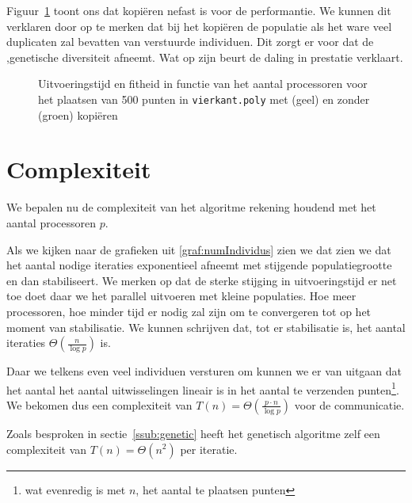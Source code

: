 Figuur~\ref{graf:nocopycopy} toont ons dat kopiëren nefast is voor de performantie.
We kunnen dit verklaren door op te merken dat bij het kopiëren de populatie als het ware veel duplicaten zal bevatten van verstuurde individuen. Dit zorgt er voor dat de ,genetische diversiteit afneemt. Wat op zijn beurt de daling in prestatie verklaart.

\begin{figure}[H]

\caption{Uitvoeringstijd en fitheid in functie van het aantal processoren voor het plaatsen van 500 punten in \texttt{vierkant.poly} met (geel) en zonder (groen) kopiëren}
\label{graf:nocopycopy}
\end{figure}

\section{Complexiteit}
\label{sub:parrcomplex}
We bepalen nu de complexiteit van het algoritme rekening houdend met het aantal processoren $p$.


Als we kijken naar de grafieken uit \ref{graf:numIndividus} zien we dat zien we dat het aantal nodige iteraties exponentieel afneemt met stijgende populatiegrootte en dan stabiliseert. We merken op dat de sterke stijging in uitvoeringstijd er net toe doet daar we het parallel uitvoeren met kleine populaties. Hoe meer processoren, hoe minder tijd er nodig zal zijn om te convergeren tot op het moment van stabilisatie. We kunnen schrijven dat, tot er stabilisatie is, het aantal iteraties $\Theta\left(\frac{n}{\log{p}}\right)$ is.

Daar we telkens even veel individuen versturen om kunnen we er van uitgaan dat het aantal het aantal uitwisselingen lineair is in het aantal te verzenden punten\footnote{wat evenredig is met $n$, het aantal te plaatsen punten}. We bekomen dus een complexiteit van $T(n)=\Theta\left(\frac{p\cdot n}{\log{p}}\right)$ voor de communicatie. 


Zoals besproken in sectie~\ref{ssub:genetic} heeft het genetisch algoritme zelf een complexiteit van $T(n)=\Theta(n^2)$ per iteratie. 

